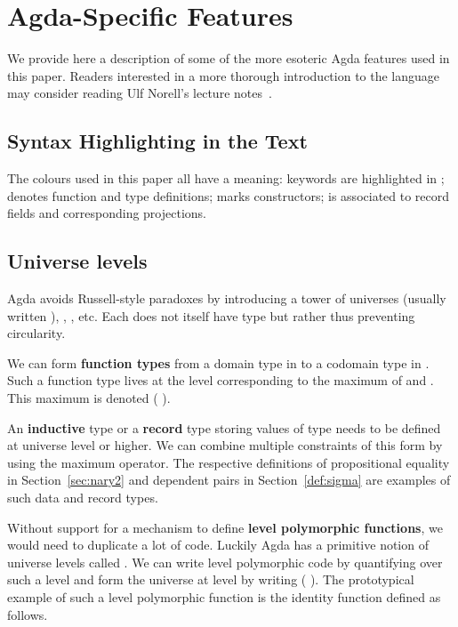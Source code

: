 \section{Agda-Specific Features}\label{appendix:agda}

We provide here a description of some of the more esoteric Agda
features used in this paper. Readers interested in a more thorough
introduction to the language may consider reading Ulf Norell's lecture
notes~\cite{DBLP:conf/afp/Norell08}.

\subsection{Syntax Highlighting in the Text}

The colours used in this paper all have a meaning: keywords are highlighted
in ;  denotes function and type definitions; 
marks constructors;  is associated to record fields and
corresponding projections.

\subsection{Universe levels}\label{appendix:agda:level}

Agda avoids Russell-style paradoxes by introducing a tower of universes
 (usually written ), , , etc. Each
 does not itself have type  but rather  thus
preventing circularity.

We can form {\bf function types} from a domain type in  to a codomain
type in . Such a function type lives at the level corresponding
to the maximum of  and . This maximum is denoted {(  )}.

An {\bf inductive} type or a {\bf record} type storing values of type 
needs to be defined at universe level  or higher. We can combine multiple
constraints of this form by using the maximum operator. The respective definitions
of propositional equality in Section~\ref{sec:nary2} and dependent pairs in
Section~\ref{def:sigma} are examples of such data and record types.

Without support for a mechanism to define {\bf level polymorphic functions},
we would need to duplicate a lot of code. Luckily Agda has a primitive notion
of universe levels called . We can write level polymorphic code by
quantifying over such a level  and form the universe at level
 by writing ( ). The prototypical example of such a level
polymorphic function is the identity function  defined as follows.

